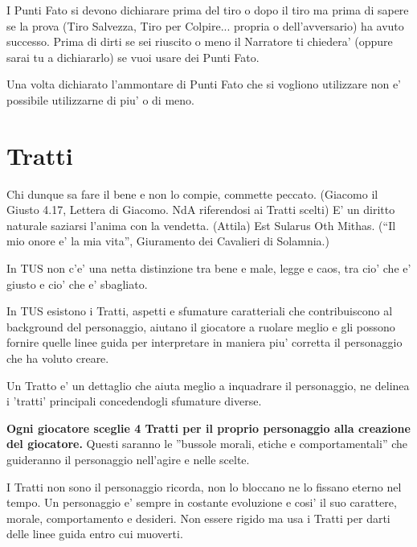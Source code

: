 \documentclass[a4paper,11pt,twoside,openany]{dndbook}
\begin{document}
I Punti Fato si devono dichiarare prima del tiro o dopo il tiro ma prima di sapere se la prova (Tiro Salvezza, Tiro per Colpire... propria o dell’avversario) ha avuto successo. 
Prima di dirti se sei riuscito o meno il Narratore ti chiedera’ (oppure sarai tu a dichiararlo) se vuoi usare dei Punti Fato.

Una volta dichiarato l’ammontare di Punti Fato che si vogliono utilizzare non e’ possibile utilizzarne di piu' o di meno.

\section{Tratti}

\label{tratti}
\begin{quotebox}
Chi dunque sa fare il bene e non lo compie, commette peccato. (Giacomo il Giusto 4.17, Lettera di Giacomo. NdA riferendosi ai Tratti scelti)\linebreak\linebreak
E' un diritto naturale saziarsi l'anima con la vendetta. (Attila)\linebreak\linebreak
Est Sularus Oth Mithas. (“Il mio onore e' la mia vita”, Giuramento dei Cavalieri di Solamnia.)\end{quotebox}

In TUS non c'e' una netta distinzione tra bene e male, legge e caos, tra cio' che e' giusto e cio' che e' sbagliato.

In TUS esistono i Tratti, aspetti e sfumature caratteriali che contribuiscono al background del personaggio, aiutano il giocatore a ruolare meglio e gli possono fornire quelle linee guida per interpretare in maniera piu' corretta il personaggio che ha voluto creare.

Un Tratto e' un dettaglio che aiuta meglio a inquadrare il personaggio, ne delinea i 'tratti' principali concedendogli sfumature diverse.

\textbf{Ogni giocatore sceglie 4 Tratti per il proprio personaggio alla creazione del giocatore.} Questi saranno le ''bussole morali, etiche e comportamentali'' che guideranno il personaggio nell'agire e nelle scelte.

I Tratti non sono il personaggio ricorda, non lo bloccano ne lo fissano eterno nel tempo. Un personaggio e' sempre in costante evoluzione e cosi' il suo carattere, morale, comportamento e desideri. Non essere rigido ma usa i Tratti per darti delle linee guida entro cui muoverti.
\end{document}
